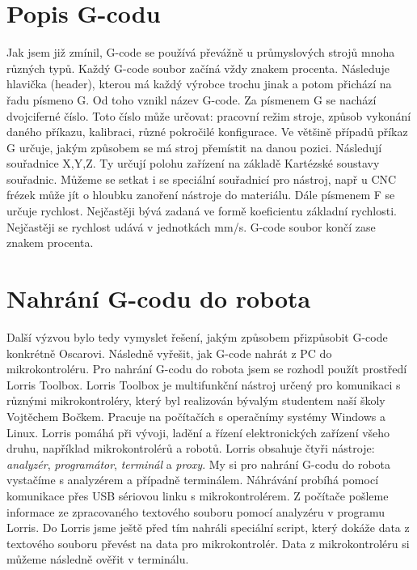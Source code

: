     \section{Popis G-codu}
    
    Jak jsem již zmínil, G-code se používá převážně u průmyslových strojů mnoha různých typů. Každý G-code soubor začíná vždy znakem procenta. Následuje hlavička (header), kterou má každý výrobce trochu jinak a potom přichází na řadu písmeno G. Od toho vznikl název G-code. Za písmenem G se nachází dvojciferné číslo. Toto číslo může určovat: pracovní režim stroje, způsob vykonání daného příkazu, kalibraci, různé pokročilé konfigurace. Ve většině případů příkaz G určuje, jakým způsobem se má stroj přemístit na danou pozici. Následují souřadnice X,Y,Z. Ty určují polohu zařízení na základě Kartézské soustavy souřadnic. Můžeme se setkat i se speciální souřadnicí pro nástroj, např u CNC frézek může jít o hloubku zanoření nástroje do materiálu. Dále písmenem F se určuje rychlost. Nejčastěji bývá zadaná ve formě koeficientu základní rychlosti. Nejčastěji se rychlost udává v jednotkách mm/s. G-code soubor končí zase znakem procenta.
    \cite{G-code-wiki} \cite{G-kód}
    
    \section{Nahrání G-codu do robota}
    Další výzvou bylo tedy vymyslet řešení, jakým způsobem přizpůsobit G-code konkrétně Oscarovi. Následně vyřešit, jak G-code nahrát z PC do mikrokontroléru. Pro nahrání G-codu do robota jsem se rozhodl použít prostředí Lorris Toolbox. Lorris Toolbox je multifunkční nástroj určený pro komunikaci s různými mikrokontroléry, který byl realizován bývalým studentem naší školy Vojtěchem Bočkem. Pracuje na počítačích s operačnímy systémy Windows a Linux. Lorris pomáhá při vývoji, ladění a řízení elektronických zařízení všeho druhu, například mikrokontrolérů a  robotů.
    Lorris obsahuje čtyři nástroje: \textit{analyzér}, \textit{programátor}, \textit{terminál} a \textit{proxy}. My si pro nahrání G-codu do robota vystačíme s analyzérem a případně terminálem. Náhrávání probíhá pomocí komunikace přes USB sériovou linku s mikrokontrolérem. Z počítače pošleme informace ze zpracovaného textového souboru pomocí analyzéru v programu Lorris. Do Lorris jsme ještě před tím nahráli speciální script, který dokáže data z textového souboru převést na data pro mikrokontrolér. Data z mikrokontroléru si můžeme následně ověřit v terminálu. \cite{bibtex:Lorris}
    
    
    
    
